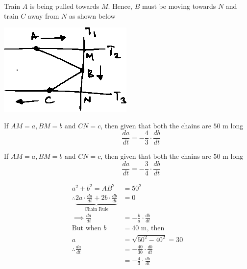 \documentclass[14pt,fleqn]{extarticle}
\newcommand\dadt{\frac{da}{dt}}
\newcommand\dbdt{\frac{db}{dt}}
\begin{document}
\begin{problem}
\begin{step}
\begin{options}
	
	\end{options}
	\reason
	
      Train $A$ is being pulled towards $M$.
      Hence, $B$  must be moving towards $N$
      and train $C$ away from $N$ as shown below 
      
      \begin{center}
\includegraphics[scale=1.5]{333-B.eps}
\end{center}
      
\end{step}

\begin{step}
  \begin{options} 
     \correct 
       
     If $AM = a, BM = b$ and $CN = c$, then given that both the chains are $50$ m long 
     \[ \qquad\qquad \dadt = -\frac{4}{3}\cdot\dbdt \]  
     \incorrect
     
     If $AM = a, BM = b$ and $CN = c$, then given that both the chains are $50$ m long 
     \[ \qquad\qquad \dadt = -\frac{3}{4}\cdot\dbdt \]  
        
    \end{options} 
     \reason 
       
     \begin{align}
     a^2 + b^2 = AB^2 &= 50^2\\
     \therefore \underbrace{2a\cdot \dadt + 2b\cdot \dbdt}_{\text{Chain Rule}} &= 0 \\
     \implies \dadt &= -\frac{b}{a}\cdot \dbdt \\
     \text{But when }b &= 40\text{ m, then }\\
     a &= \sqrt{50^2 - 40^2} = 30 \\ 
     \therefore \dadt &= -\frac{40}{30}\cdot\dbdt \\
     &= -\frac{4}{3}\cdot\dbdt
\end{align}  
\end{step}

\begin{step}
  \begin{options} 
     \correct 
       

\end{options}
\end{step}
\end{problem}
\end{document}
